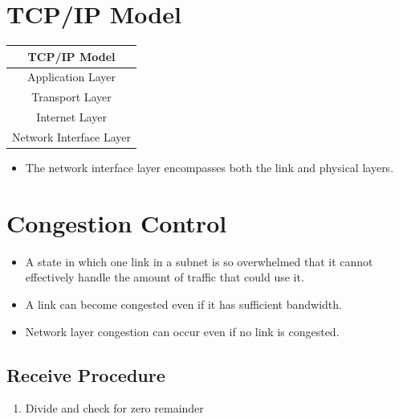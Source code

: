 \documentclass{article}
\begin{document}
\section{TCP/IP Model}

\begin{center}
    \begin{tabular}{|c|}
        \hline
        TCP/IP Model \\
        \hline
        Application Layer \\
        \hline
        Transport Layer \\
        \hline
        Internet Layer \\
        \hline
        Network Interface Layer \\
        \hline
    \end{tabular}
\end{center}

\begin{itemize}
    \item The network interface layer encompasses both the link and physical layers.
\end{itemize}

\section{Congestion Control}

\begin{itemize}
    \item A state in which one link in a subnet is so overwhelmed that it cannot effectively handle the amount of traffic that could use it.
    \item A link can become congested even if it has sufficient bandwidth.
    \item Network layer congestion can occur even if no link is congested.
\end{itemize}



\subsection{Receive Procedure}
\begin{enumerate}
    \item Divide and check for zero remainder
\end{enumerate}
\end{document}
